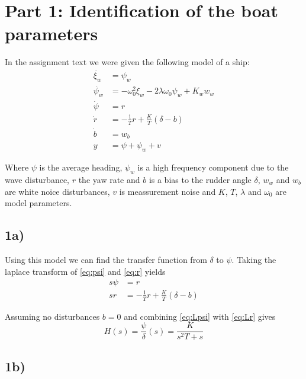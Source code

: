 \section{Part 1: Identification of the boat  parameters}

In the assignment text we were given the following model of a ship:
\begin{subequations}
	\label{eq:completeModel}
		\begin{align}
				\dot{\xi_w} &= \psi_w \label{eq:xi_w}\\
				\dot{\psi_w} &= -\omega_0^2\xi_w-2\lambda\omega_0\psi_w+K_ww_w \label{eq:psi_w}\\
				\dot{\psi} &= r \label{eq:psi} \\
				\dot{r} &= -\frac{1}{T}r+\frac{K}{T}(\delta-b) \label{eq:r} \\
				\dot{b} &= w_b \label{eq:b} \\
				y &= \psi + \psi_w + v \label{eq:y}
		\end{align}
\end{subequations}

Where $\psi$ is the average heading, $\psi_w$ is a high frequency component due to the wave disturbance, $r$ the yaw rate and $b$ is a bias to the rudder angle $\delta$, $w_w$ and $w_b$ are white noice disturbances, $v$ is meassurement noise and $K$, $T$, $\lambda$ and $\omega_0$ are model parameters.


\subsection{1a)}

Using this model we can find the transfer function from $\delta$ to $\psi$. Taking the laplace transform of \cref{eq:psi} and \cref{eq:r} yields
\begin{subequations}
	\begin{align}
		s\psi &= r \label{eq:Lpsi}\\
		sr &= -\frac{1}{T}r + \frac{K}{T}(\delta-b) \label{eq:Lr}
	\end{align}
\end{subequations}

Assuming no disturbances $b = 0$ and combining \cref{eq:Lpsi} with \cref{eq:Lr} gives
\begin{equation}
	H(s) = \frac{\psi}{\delta}(s) = \frac{K}{s^2T+s} \label{eq:H(s)}
\end{equation}

\subsection{1b)}

